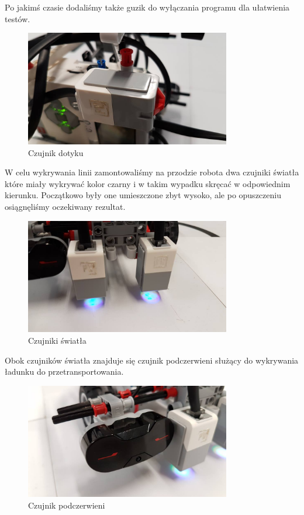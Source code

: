 Po jakimś czasie dodaliśmy także guzik do wyłączania programu dla ułatwienia testów.

\begin{figure}[H]
    \centering
    \includegraphics[width=0.8\textwidth]{Images/touch_sensor}
    \caption[]{Czujnik dotyku}
\end{figure}

W celu wykrywania linii zamontowaliśmy na przodzie robota dwa czujniki światła które miały wykrywać kolor czarny i w takim wypadku skręcać w odpowiednim kierunku. Początkowo były one umieszczone zbyt wysoko, ale po opuszczeniu osiągnęliśmy oczekiwany rezultat.

\begin{figure}[H]
    \centering
    \includegraphics[width=0.8\textwidth]{Images/light_sensors}
    \caption[]{Czujniki światła}
\end{figure}

Obok czujników światła znajduje się czujnik podczerwieni służący do wykrywania ładunku do przetransportowania.

\begin{figure}[H]
    \centering
    \includegraphics[width=0.8\textwidth]{Images/infrared_sensor}
    \caption[]{Czujnik podczerwieni}
\end{figure}

